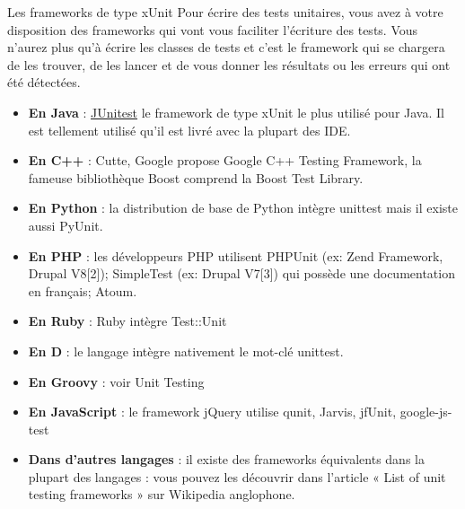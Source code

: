 \documentclass{beamer}
\begin{document}
\begin{frame}{Les frameworks de type xUnit}
Pour écrire des tests unitaires, vous avez à votre disposition des frameworks qui vont vous faciliter l'écriture des tests. Vous n'aurez plus qu'à écrire les classes de tests et c'est le framework qui se chargera de les trouver, de les lancer et de vous donner les résultats ou les erreurs qui ont été détectées. \\

  \begin{itemize}
  \item{{\bfseries En Java} : {\href{http://junit.org/junit4/}{JUnitest}} le framework de type xUnit le plus utilisé pour Java. Il est tellement utilisé qu'il est livré avec la plupart des IDE.} 
  \end{itemize}   
\end{frame}
  \begin{frame}
  \begin{itemize}
  \item{{\bfseries En C++} : Cutte, Google propose Google C++ Testing Framework, la fameuse bibliothèque Boost comprend la Boost Test Library.}
  \item{{\bfseries En Python} : la distribution de base de Python intègre unittest mais il existe aussi PyUnit.}
  \item{{\bfseries En PHP} : les développeurs PHP utilisent PHPUnit (ex: Zend Framework, Drupal V8[2]); SimpleTest (ex: Drupal V7[3]) qui possède une documentation en français; Atoum.}
  \item{{\bfseries En Ruby} : Ruby intègre Test::Unit} 
  \end{itemize}   
\end{frame}
  \begin{frame}
  \begin{itemize}
  \item{{\bfseries En D} : le langage intègre nativement le mot-clé unittest.}
  \item{{\bfseries En Groovy} : voir Unit Testing}
  \item{{\bfseries En JavaScript} : le framework jQuery utilise qunit, Jarvis, jfUnit, google-js-test}
  \item{{\bfseries Dans d'autres langages} : il existe des frameworks équivalents dans la plupart des langages : vous pouvez les découvrir dans l'article « List of unit testing frameworks » sur Wikipedia anglophone.}

  \end{itemize}
\end{frame}
    
\end{document}
